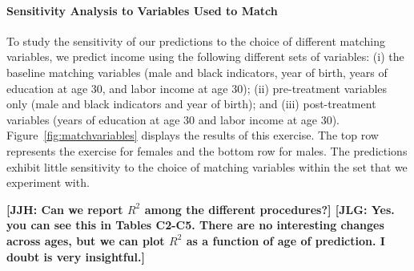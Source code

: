 \paragraph{Sensitivity Analysis to Variables Used to Match}

\noindent To study the sensitivity of our predictions to the choice of different matching variables, we predict income using the following different sets of variables: (i) the baseline matching variables (male and black indicators, year of birth, years of education at age 30, and labor income at age 30); (ii) pre-treatment variables only (male and black indicators and year of birth); and (iii) post-treatment variables (years of education at age 30 and labor income at age 30). Figure~\ref{fig:matchvariables} displays the results of this exercise. The top row represents the exercise for females and the bottom row for males. The predictions exhibit little sensitivity to the choice of matching variables within the set that we experiment with.

\textbf{[JJH: Can we report $R^2$ among the different procedures?] [JLG: Yes. you can see this in Tables C2-C5. There are no interesting changes across ages, but we can plot $R^2$ as a function of age of prediction. I doubt is very insightful.] }

